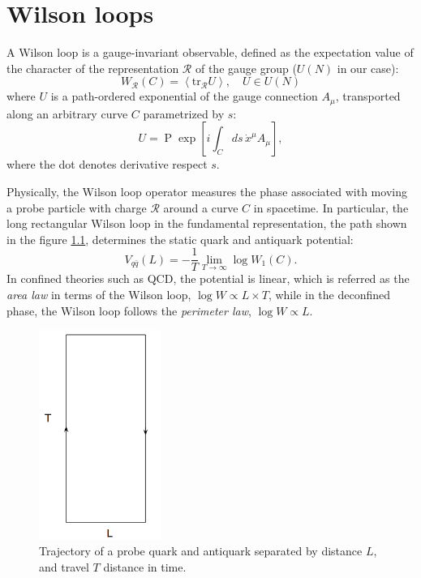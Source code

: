 \chapter{Wilson loops}\label{ch:WilsonLoops}


A Wilson loop is a gauge-invariant observable, 
defined as the expectation value of the character of the representation $\mathcal{R}$ of the gauge group 
($U(N)$ in our case):
\begin{equation}
  W_{\mathcal{R}}(C) =  \left\langle \text{tr}_{\mathcal{R}} U \right\rangle, \quad U \in U(N)
\end{equation}
where $U$ is a path-ordered exponential of the gauge connection $A_\mu$, 
transported along an arbitrary curve $C$ parametrized by $s$:
\begin{equation}
 U = \mathop{\mathrm{P}}\exp 
    \left[ 
	i \int_C ds\,	
	  \dot{x}^\mu A_\mu
    \right],
\end{equation}
where the dot denotes derivative respect $s$.

Physically, the Wilson loop operator measures the phase associated with moving a probe particle with charge
$\mathcal{R}$ around a curve $C$ in spacetime.
In particular, the long rectangular Wilson loop in the fundamental representation, the path shown in the figure \ref{fig:WLrectangle},
determines the static quark and antiquark potential:
\begin{equation}
 V_{q\bar{q}} (L) = -\dfrac{1}{T} \lim_{T\rightarrow\infty} \log W_1(C).
\end{equation}
In confined theories such as QCD, the potential is linear,
which is referred as the \emph{area law} in terms of the Wilson loop,
$\log W \propto L\times T$,
while in the deconfined phase, the Wilson loop follows the \emph{perimeter law},  $\log W \propto L$.


\begin{figure}[t]
\begin{center}
 \centerline{\includegraphics[width=4cm]{Images/WLrectangle.png}}
\end{center}
\caption{\label{fig:WLrectangle} Trajectory of a probe quark and antiquark separated by distance $L$, and travel $T$ distance in time. }
\end{figure}


